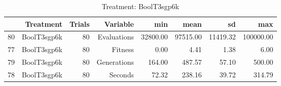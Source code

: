\begin{table}[ht]
\centering
\begin{tabular}{rrrrrrrr}
  \hline
 & Treatment & Trials & Variable & min & mean & sd & max \\ 
  \hline
80 & BoolT3sgp6k &  80 & Evaluations & 32800.00 & 97515.00 & 11419.32 & 100000.00 \\ 
  77 & BoolT3sgp6k &  80 & Fitness & 0.00 & 4.41 & 1.38 & 6.00 \\ 
  79 & BoolT3sgp6k &  80 & Generations & 164.00 & 487.57 & 57.10 & 500.00 \\ 
  78 & BoolT3sgp6k &  80 & Seconds & 72.32 & 238.16 & 39.72 & 314.79 \\ 
   \hline
\end{tabular}
\caption{Treatment: BoolT3sgp6k} 
\end{table}
